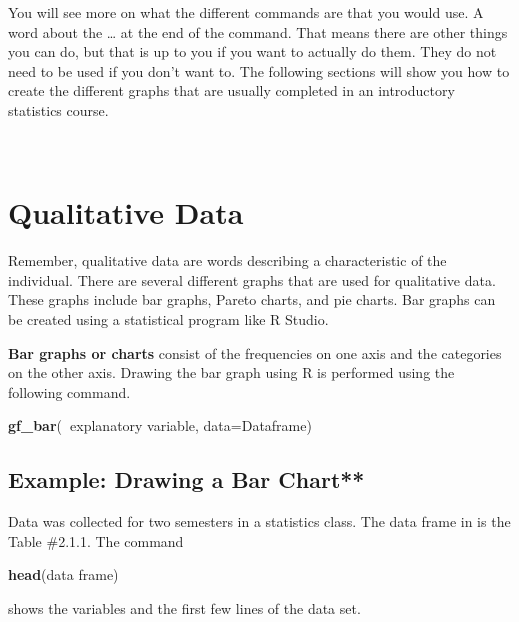 \documentclass[
]{book}
\newenvironment{Shaded}{\begin{snugshade}}{\end{snugshade}}
\newcommand{\DataTypeTok}[1]{\textcolor[rgb]{0.13,0.29,0.53}{#1}}
\newcommand{\KeywordTok}[1]{\textcolor[rgb]{0.13,0.29,0.53}{\textbf{#1}}}
\newcommand{\NormalTok}[1]{#1}
\newcommand{\OperatorTok}[1]{\textcolor[rgb]{0.81,0.36,0.00}{\textbf{#1}}}
\begin{document}
You will see more on what the different commands are that you would use. A word about the \ldots{} at the end of the command. That means there are other things you can do, but that is up to you if you want to actually do them. They do not need to be used if you don't want to. The following sections will show you how to create the different graphs that are usually completed in an introductory statistics course.

\emph{\\
}

\hypertarget{qualitative-data}{%
\section{Qualitative Data}\label{qualitative-data}}

Remember, qualitative data are words describing a characteristic of the individual. There are several different graphs that are used for qualitative data. These graphs include bar graphs, Pareto charts, and pie charts. Bar graphs can be created using a statistical program like R Studio.

\textbf{Bar graphs or charts} consist of the frequencies on one axis and the categories on the other axis. Drawing the bar graph using R is performed using the following command.

\begin{Shaded}
\begin{Highlighting}[]
\KeywordTok{gf_bar}\NormalTok{(}\OperatorTok{~}\NormalTok{explanatory variable, }\DataTypeTok{data=}\NormalTok{Dataframe)}
\end{Highlighting}
\end{Shaded}

\hypertarget{example-drawing-a-bar-chart}{%
\subsection{Example: Drawing a Bar Chart**}\label{example-drawing-a-bar-chart}}

Data was collected for two semesters in a statistics class. The data frame in is the Table \#2.1.1. The command

\begin{Shaded}
\begin{Highlighting}[]
\KeywordTok{head}\NormalTok{(data frame) }
\end{Highlighting}
\end{Shaded}

shows the variables and the first few lines of the data set.
\end{document}
